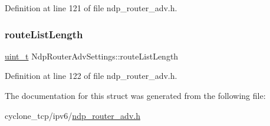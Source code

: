 Definition at line 121 of file ndp\+\_\+router\+\_\+adv.\+h.

\mbox{\label{structNdpRouterAdvSettings_abdaa4e2480f0ba5dadb7e7b00784aab5}} 
\subsubsection{\texorpdfstring{route\+List\+Length}{routeListLength}}
{\footnotesize\ttfamily \hyperlink{compiler__port_8h_a12a1e9b3ce141648783a82445d02b58d}{uint\+\_\+t} Ndp\+Router\+Adv\+Settings\+::route\+List\+Length}



Definition at line 122 of file ndp\+\_\+router\+\_\+adv.\+h.



The documentation for this struct was generated from the following file\+:\begin{DoxyCompactItemize}
\item 
cyclone\+\_\+tcp/ipv6/\hyperlink{ndp__router__adv_8h}{ndp\+\_\+router\+\_\+adv.\+h}\end{DoxyCompactItemize}
